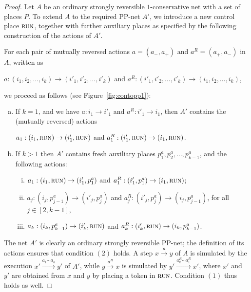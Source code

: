 \documentclass[11pt,a4paper]{amsart}
\newcommand{\step}[1]{\mathrel{\xrightarrow{#1}}}
\newcommand{\pptrans}[3]{#1:(#2) \rightarrow (#3)}
\newcommand{\pptransone}[3]{#1: #2 \rightarrow #3}
\newcommand{\ininter}[3]{#1 \in [#2,#3]}
\newcommand{\myvec}[1]{#1}
\newcommand{\prun}{\textsc{run}}
\let\origtextsc\textsc
\renewcommand{\textsc}[1]{\textnormal{\origtextsc{#1}}}
\theoremstyle{plain}
\theoremstyle{definition}
\theoremstyle{defC}
\theoremstyle{thmC}
\begin{document}
\begin{proof}
Let $A$ be an ordinary strongly reversible
    $1$-conservative net with a set of places $P$.
To extend $A$ to the required PP-net $A'$,
	we introduce a new control place $\prun$, 
together with further auxiliary places as specified by the following construction of the actions of $A'$.

For each pair of mutually reversed actions
	$a=(\myvec{a_-},\myvec{a_+})$ and
	$a^R=(\myvec{a_+},\myvec{a_-})$  in $A$, written as 
	\begin{center}
$\pptrans{a}{i_1,i_2,\dots,i_k}{i'_1,i'_2,\dots,i'_k}$ and
$\pptrans{a^R}{i'_1,i'_2,\dots,i'_k}{i_1,i_2,\dots,i_k}$,
	\end{center}
		we proceed as follows (see
	Figure~\ref{fig:contopp1}):
	\begin{enumerate}[(a)]	
        \item   If $k=1$, and we have 
		$\pptransone{a}{i_1}{i'_1}$ and 
		    $\pptransone{a^R}{i'_1}{i_1}$, then $A'$ contains
		    the (mutually reversed) actions 
		    \begin{center}
		    $\pptrans{a_1}{i_1,\prun}{i'_1,\prun}$ and
        $\pptrans{a_1^R}{i'_1,\prun}{i_1,\prun}$.
		    \end{center}			    
	    \item
		If $k > 1$ then
$A'$ contains fresh auxiliary places $p^a_1,p^a_2,\dots,p^a_{k-1}$, and 
 the following actions:
			\begin{enumerate}[(i)]
            \item 
            $\pptrans{a_1}{i_1,\prun}{i'_1,p^a_1}$ and 
            $\pptrans{a_1^R}{i'_1,p^a_1}{i_1,\prun}$;
            \item
            $\pptrans{a_j}{i_j,p^a_{j-1}}{i'_j,p^a_j}$ and
             $\pptrans{a_j^R}{i'_j,p^a_j}{i_j,p^a_{j-1}}$,
			for all $\ininter{j}{2}{k{-}1}$, 

            \item 
            $\pptrans{a_k}{i_k,p^a_{k-1}}{i'_k,\prun}$ and
            $\pptrans{a_k^R}{i'_k,\prun}{i_k,p^a_{k-1}}$.
        \end{enumerate}
    \end{enumerate}
The net $A'$ is clearly an ordinary strongly reversible PP-net; 
	the definition of its actions ensures that condition $(2)$ holds.
A step $x\step{a}y$ of $A$ is simulated
by the execution $x'\step{a_1\cdots a_k}y'$ of $A'$, 
	while $y\step{a^R}x$
	is simulated by $y'\step{a^R_k\cdots a^R_1}x'$, 
	where $x'$ and $y'$ are obtained from $x$ and $y$ by placing a token
	in $\prun$. Condition $(1)$ thus holds as well.
\end{proof}
\end{document}
